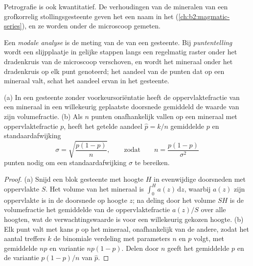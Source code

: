Petrografie is ook kwantitatief. De verhoudingen van de mineralen van een grofkorrelig stollingsgesteente
geven het een naam in het  (\cref{ch:b2:magmatic-series}), en ze worden onder de
microscoop gemeten.

\begin{definition}\label{def:b2:field-lab-methods-2:modal}
Een \emph{modale analyse} is de meting van de  van een
gesteente. Bij \emph{puntentelling} wordt een
slijpplaatje in gelijke stappen langs een regelmatig raster onder het dradenkruis van de microscoop verschoven, en wordt
het mineraal onder het dradenkruis op elk punt genoteerd; het aandeel van de punten dat
op een mineraal valt, schat het aandeel ervan in het gesteente.
\end{definition}

\begin{proposition}\label{prop:b2:field-lab-methods-2:counting}
(a) In een gesteente zonder voorkeursoriëntatie heeft de oppervlaktefractie van een mineraal in een willekeurig geplaatste doorsnede
gemiddeld de waarde van zijn volumefractie. (b) Als $n$ punten onafhankelijk vallen
op een mineraal met oppervlaktefractie $p$, heeft het getelde aandeel $\hat p = k/n$ gemiddelde $p$ en
standaardafwijking
\begin{equation}
\sigma = \sqrt{\frac{p(1-p)}{n}} , \qquad\text{zodat}\qquad n = \frac{p(1-p)}{\sigma^2}
\label{eq:b2:field-lab-methods-2:binomial}
\end{equation}
punten nodig om een standaardafwijking $\sigma$ te bereiken.
\end{proposition}

\begin{proof}
(a) Snijd een blok gesteente met hoogte $H$ in evenwijdige doorsneden met oppervlakte $S$. Het volume van het
mineraal is $\int_0^H a(z)\,\mathrm{d}z$, waarbij $a(z)$ zijn oppervlakte is in de doorsnede op hoogte $z$;
na deling door het volume $SH$ is de volumefractie het gemiddelde van de oppervlaktefractie $a(z)/S$ over
alle hoogten, wat de verwachtingswaarde is voor een willekeurig gekozen hoogte. (b) Elk punt valt met kans $p$ op het
mineraal, onafhankelijk van de andere, zodat het aantal treffers $k$ de
binomiale verdeling met parameters $n$ en $p$ volgt, met gemiddelde $np$ en variantie $np(1-p)$. Delen door
$n$ geeft het gemiddelde $p$ en de variantie $p(1-p)/n$ van $\hat p$.
\end{proof}

